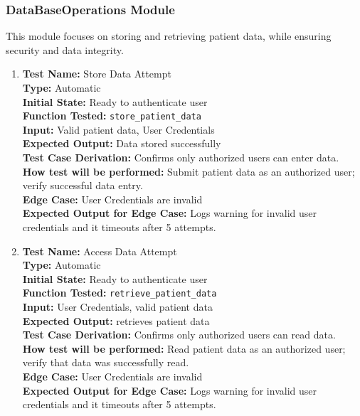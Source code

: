 \documentclass[12pt, titlepage]{article}
\begin{document}
\subsubsection{DataBaseOperations Module}
This module focuses on storing and retrieving patient data, while ensuring security and data integrity.
\begin{enumerate}
  \item \textbf{Test Name:}  Store Data Attempt\\
    \textbf{Type:}  Automatic\\
    \textbf{Initial State:}  Ready to authenticate user \\
    \textbf{Function Tested:}  \verb|store_patient_data|\\
    \textbf{Input:}  Valid patient data, User Credentials\\
    \textbf{Expected Output:}  Data stored successfully\\
    \textbf{Test Case Derivation:}  Confirms only authorized users can enter data.\\
    \textbf{How test will be performed:}  Submit patient data as an authorized user; verify successful data entry.\\
    \textbf{Edge Case:}  User Credentials are invalid\\
    \textbf{Expected Output for Edge Case:}  Logs warning for invalid user credentials and it timeouts after 5 attempts.\\

  \item \textbf{Test Name:}  Access Data Attempt\\
    \textbf{Type:}  Automatic\\
    \textbf{Initial State:}  Ready to authenticate user\\
    \textbf{Function Tested:}  \verb|retrieve_patient_data|\\
    \textbf{Input:}  User Credentials, valid patient data\\
    \textbf{Expected Output:}  retrieves patient data\\
    \textbf{Test Case Derivation:}  Confirms only authorized users can read data.\\
    \textbf{How test will be performed:}  Read patient data as an authorized user; verify that data was successfully read.\\
    \textbf{Edge Case:}  User Credentials are invalid\\
    \textbf{Expected Output for Edge Case:}  Logs warning for invalid user credentials and it timeouts after 5 attempts.\\
\end{enumerate}
\end{document}
